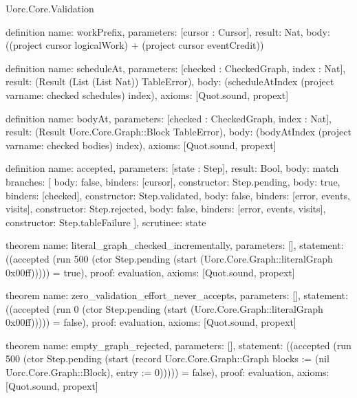 \begin{lexlean}{Uorc.Core.Validation}
\begin{semanticmodule}
definition{
  name: workPrefix,
  parameters: [cursor : Cursor],
  result: Nat,
  body: ((project cursor logicalWork) + (project cursor eventCredit))
}

definition{
  name: scheduleAt,
  parameters: [checked : CheckedGraph, index : Nat],
  result: (Result (List (List Nat)) TableError),
  body: (scheduleAtIndex (project var{name: checked} schedules) index),
  axioms: [Quot.sound, propext]
}

definition{
  name: bodyAt,
  parameters: [checked : CheckedGraph, index : Nat],
  result: (Result Uorc.Core.Graph::Block TableError),
  body: (bodyAtIndex (project var{name: checked} bodies) index),
  axioms: [Quot.sound, propext]
}

definition{
  name: accepted,
  parameters: [state : Step],
  result: Bool,
  body: match{
    branches: [
      {body: false, binders: [cursor], constructor: Step.pending},
      {body: true, binders: [checked], constructor: Step.validated},
      {body: false, binders: [error, events, visits], constructor: Step.rejected},
      {body: false, binders: [error, events, visits], constructor: Step.tableFailure}
    ],
    scrutinee: state
  }
}

theorem{
  name: literal_graph_checked_incrementally,
  parameters: [],
  statement: ((accepted (run 500 (ctor Step.pending (start (Uorc.Core.Graph::literalGraph 0x00ff))))) = true),
  proof: evaluation{},
  axioms: [Quot.sound, propext]
}

theorem{
  name: zero_validation_effort_never_accepts,
  parameters: [],
  statement: ((accepted (run 0 (ctor Step.pending (start (Uorc.Core.Graph::literalGraph 0x00ff))))) = false),
  proof: evaluation{},
  axioms: [Quot.sound, propext]
}

theorem{
  name: empty_graph_rejected,
  parameters: [],
  statement: ((accepted (run 500 (ctor Step.pending (start (record Uorc.Core.Graph::Graph {blocks := (nil Uorc.Core.Graph::Block), entry := 0}))))) = false),
  proof: evaluation{},
  axioms: [Quot.sound, propext]
}
\end{semanticmodule}
\end{lexlean}
